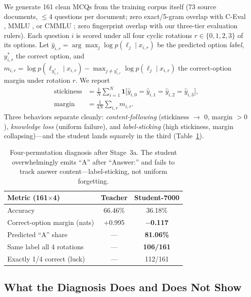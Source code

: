 \documentclass[11pt]{article}
\begin{document}
We generate 161 clean MCQs from the training corpus itself (73 source
documents, $\le$4 questions per document; zero exact/5-gram overlap with
C-Eval \citep{huang2023ceval}, MMLU \citep{hendrycks2021mmlu}, or CMMLU
\citep{li2023cmmlu}; zero fingerprint overlap with our three-tier
evaluation rulers). Each question $i$ is scored under all four cyclic
rotations $r \in \{0,1,2,3\}$ of its options. Let
$\hat{y}_{i,r} = \arg\max_j \log p(\ell_j \mid x_{i,r})$ be the
predicted option \emph{label}, $y^{*}_{i,r}$ the correct option, and
$m_{i,r} = \log p(\ell_{y^{*}_{i,r}} \mid x_{i,r}) - \max_{j \neq y^{*}_{i,r}} \log p(\ell_j \mid x_{i,r})$
the correct-option margin under rotation $r$. We report
\begin{align}
\text{stickiness} &= \frac{1}{N}\sum_{i=1}^{N} \mathbf{1}\bigl[\hat{y}_{i,0} = \hat{y}_{i,1} = \hat{y}_{i,2} = \hat{y}_{i,3}\bigr], \label{eq:stick}\\
\text{margin} &= \frac{1}{4N}\sum_{i,r} m_{i,r}. \label{eq:margin}
\end{align}
Three behaviors separate cleanly: \emph{content-following}
(stickiness $\to$ 0, margin $>0$), \emph{knowledge loss} (uniform
failure), and \emph{label-sticking} (high stickiness, margin
collapsing)---and the student lands squarely in the third
(Table~\ref{tab:diag}).

\begin{table}[t]
\centering
\small
\begin{tabular}{@{}lcc@{}}
\toprule
Metric (161$\times$4) & Teacher & Student-7000 \\
\midrule
Accuracy & 66.46\% & 36.18\% \\
Correct-option margin (nats) & +0.995 & \textbf{$-$0.117} \\
Predicted ``A'' share & --- & \textbf{81.06\%} \\
Same label all 4 rotations & --- & \textbf{106/161} \\
Exactly 1/4 correct (luck) & --- & 112/161 \\
\bottomrule
\end{tabular}
\caption{Four-permutation diagnosis after Stage~3a. The student
overwhelmingly emits ``A'' after ``Answer:'' and fails to track answer
content---label-sticking, not uniform forgetting.}
\label{tab:diag}
\end{table}

\subsection{What the Diagnosis Does and Does Not Show}
\end{document}
